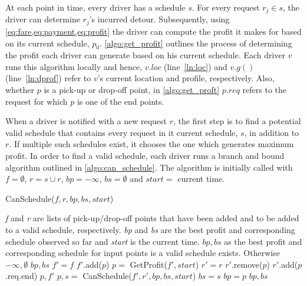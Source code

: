 At each point in time, every driver has a schedule $s$. For every request $r_j \in s$, the driver can determine $r_j$'s incurred detour. Subsequently, using \cref{eq:fare,eq:payment,eq:profit} the driver can compute the profit it makes for \fname based on its current schedule, $p_0$. \cref{algo:get_profit} outlines the process of determining the profit each driver can generate based on his current schedule. Each driver $v$ runs this algorithm locally and hence, $v.loc$ (line~\ref{ln:loc}) and $v.g()$ (line~\ref{ln:dprof}) refer to $v$'s current location and profile, respectively. Also, whether $p$ is a pick-up or drop-off point, in \cref{algo:get_proft} $p.req$ refers to the request for which $p$ is one of the end points.

When a driver is notified with a new request $r$, the first step is to find a potential valid schedule that contains every request in it current schedule, $s$, in addition to $r$. If multiple such schedules exist, it chooses the one which generates maximum profit. In order to find a valid schedule, each driver runs a branch and bound algorithm outlined in \cref{algo:can_schedule}. The algorithm is initially called with $f = \emptyset$, $r = s \cup r$, $bp = -\infty$, $bs = \emptyset$ and $start =$ current time. 

\begin{algorithm}[!h]
\caption{CanSchedule($f, r, bp, bs, start$)}
\label{algo:can_schedule}
\begin{algorithmic}[1]
\REQUIRE \emph{f} and \emph{r} are lists of pick-up/drop-off points that have been added and to be added to a valid schedule, respectively. \emph{bp} and \emph{bs} are the best profit and corresponding schedule observed so far and \emph{start} is the current time.
\ENSURE $bp, bs$ as the best profit and corresponding schedule for input points is a valid schedule exists. Otherwise $-\infty, \emptyset$
	\RETURN $bp, bs$
\ENDIF
{}
	\STATE $f' = f$
	\STATE $f'$.add($p$)
	\STATE $p =$ GetProfit($f', start$)
		\STATE $r' = r$
		\STATE $r'$.remove($p$)
			\STATE $r'$.add($p$.req.end)
		\ENDIF
			\RETURN $p, f'$
		\ENDIF
		\STATE $p, s =$ CanSchedule($f', r', bp, bs, start$)
			\STATE $bs = s$
			\STATE $bp = p$
		\ENDIF
	\ENDIF
\ENDFOR
\RETURN $bp, bs$
\end{algorithmic}
\end{algorithm}

